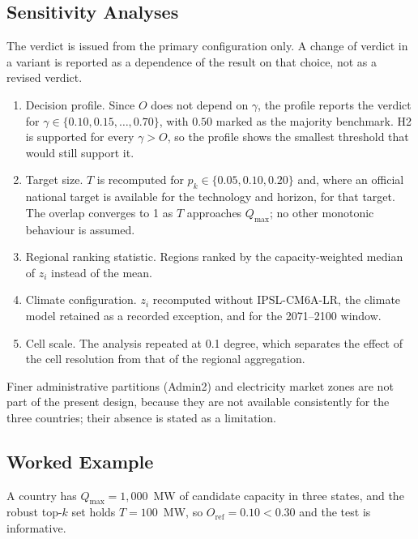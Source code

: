 \subsection{Sensitivity Analyses}
\label{subsec:h2_sensitivity}

The verdict is issued from the primary configuration only. A change of verdict
in a variant is reported as a dependence of the result on that choice, not as a
revised verdict.

\begin{enumerate}
    \item Decision profile. Since $O$ does not depend on $\gamma$, the profile
    reports the verdict for $\gamma\in\{0.10,0.15,\dots,0.70\}$, with $0.50$
    marked as the majority benchmark. H2 is supported for every
    $\gamma>O$, so the profile shows the smallest threshold that would still
    support it.
    \item Target size. $T$ is recomputed for $p_k\in\{0.05,0.10,0.20\}$ and, where
    an official national target is available for the technology and horizon,
    for that target. The overlap converges to 1 as $T$ approaches $Q_{\max}$;
    no other monotonic behaviour is assumed.
    \item Regional ranking statistic. Regions ranked by the capacity-weighted
    median of $z_i$ instead of the mean.
    \item Climate configuration. $z_i$ recomputed without IPSL-CM6A-LR, the
    climate model retained as a recorded exception, and for the 2071--2100
    window.
    \item Cell scale. The analysis repeated at 0.1 degree, which separates the
    effect of the cell resolution from that of the regional aggregation.
\end{enumerate}
Finer administrative partitions (Admin2) and electricity market zones are not
part of the present design, because they are not available consistently for the
three countries; their absence is stated as a limitation.

\subsection{Worked Example}
\label{subsec:h2_example}

A country has $Q_{\max}=1{,}000$~MW of candidate capacity in three states, and
the robust top-$k$ set holds $T=100$~MW, so $O_{\mathrm{ref}}=0.10<0.30$ and the
test is informative.

